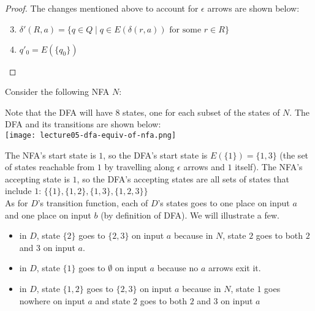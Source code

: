 \documentclass[11pt,a4paper]{article}
\begin{document}
\begin{theorem}
\begin{proof}
        The changes mentioned above to account for $\epsilon$ arrows are shown below:
        \begin{enumerate}
            \setcounter{enumi}{2}
            \item $\delta'(R,a)=\{q\in Q\mid q\in E(\delta(r,a))\text{ for some }r\in R\}$
            \item $q'_0=E(\{q_0\})$
        \end{enumerate}
    \end{proof}
\end{theorem}

\begin{example}
    Consider the following NFA $N$:


    Note that the DFA will have 8 states, one for each subset of the states of $N$. The DFA and its transitions are shown below: \\

    \texttt{[image: lecture05-dfa-equiv-of-nfa.png]}

    The NFA's start state is $1$, so the DFA's start state is $E(\{1\})=\{1,3\}$ (the set of states reachable from $1$ by travelling along $\epsilon$ arrows and $1$ itself).
    The NFA's accepting state is $1$, so the DFA's accepting states are all sets of states that include $1$: $\{\{1\}, \{1,2\},\{1,3\},\{1,2,3\}\}$ \\

    As for $D$'s transition function, each of $D$'s states goes to one place on input $a$ and one place on input $b$ (by definition of DFA). We will illustrate a few.

    \begin{itemize}
        \item in $D$, state $\{2\}$ goes to $\{2,3\}$ on input $a$ because in $N$, state $2$ goes to both $2$ and $3$ on input $a$.
        \item in $D$, state $\{1\}$ goes to $\emptyset$ on input $a$ because no $a$ arrows exit it.
        \item in $D$, state $\{1,2\}$ goes to $\{2,3\}$ on input $a$ because in $N$, state $1$ goes nowhere on input $a$ and state $2$ goes to both $2$ and $3$ on input $a$
    \end{itemize}


\end{example}
\end{document}
